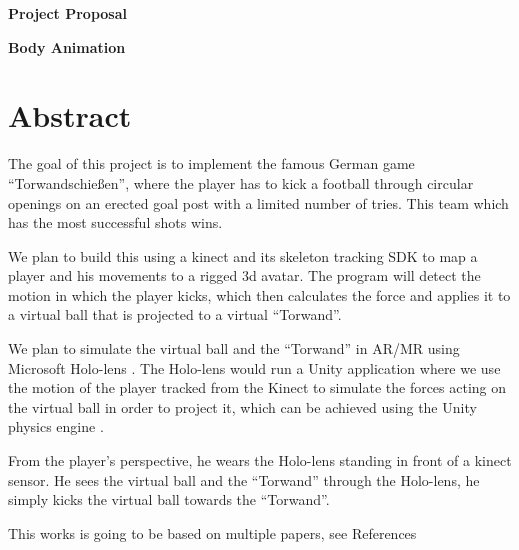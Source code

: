 \documentclass[a4paper,pagesize 10pt]{scrartcl}
\begin{document}
\begin{center}{\Huge\textbf{Project Proposal}}\end{center}
\begin{center}{\Large\textbf{Body Animation}}\end{center}

\section{Abstract}

%
%
%
%


\begin{flushleft}
The goal of this project is to implement the famous German game “Torwandschießen”, where the player has to kick a football through circular openings on an erected goal post with a limited number of tries. This team which has the most successful shots wins.
\end{flushleft}

\begin{flushleft}
We plan to build this using a kinect and its skeleton tracking SDK \cite{kinect_basic} to map a player and his movements to a rigged 3d avatar. The program will detect the motion in which the player kicks, which then calculates the force and applies it to a virtual ball that is projected to a virtual “Torwand”.
\end{flushleft}

\begin{flushleft}
We plan to simulate the virtual ball and the “Torwand” in AR/MR using Microsoft Holo-lens \cite{hololens}. The Holo-lens would run a Unity application where we use the motion of the player tracked from the Kinect to simulate the forces acting on the virtual ball in order to project it, which can be achieved using the Unity physics engine \cite{unity}.
\end{flushleft}

\begin{flushleft}
From the player’s perspective, he wears the Holo-lens standing in front of a kinect sensor. He sees the virtual ball and the “Torwand” through the Holo-lens, he simply kicks the virtual ball towards the “Torwand”.
\end{flushleft}

\begin{flushleft}
This works is going to be based on multiple papers, see References \cite{source1} \cite{source2} \cite{source3} \cite{source4} 
\end{flushleft}
\end{document}
